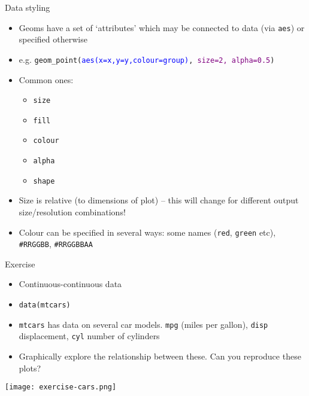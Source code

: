 \documentclass[10pt]{beamer}
\begin{document}
\begin{frame}{Data styling}
    \begin{itemize}
    \item Geoms have a set of `attributes' which may be connected to data (via \texttt{aes}) or specified otherwise
      \item[] e.g. \texttt{geom\_point(\textcolor{blue}{aes(x=x,y=y,colour=group)}, \textcolor{purple}{size=2, alpha=0.5})}
    \item Common ones:
      \begin{itemize}
      \item \texttt{size}
      \item \texttt{fill}
      \item \texttt{colour}
      \item \texttt{alpha}
      \item \texttt{shape}
      \end{itemize}
      \item Size is relative (to dimensions of plot) -- this will change for different output size/resolution combinations!
      \item Colour can be specified in several ways: some names (\texttt{red}, \texttt{green} etc), \texttt{\#RRGGBB}, \texttt{\#RRGGBBAA} 
    \end{itemize}
\end{frame}

\begin{frame}{Exercise}
  \begin{itemize}
  \item Continuous-continuous data
    \item[] \texttt{data(mtcars)}
    \item \texttt{mtcars} has data on several car models. \texttt{mpg} (miles per gallon), \texttt{disp} displacement, \texttt{cyl} number of cylinders
     \item Graphically explore the relationship between these. Can you reproduce these plots?
  \end{itemize}
  \texttt{[image: exercise-cars.png]}
\end{frame}
\end{document}
